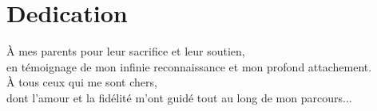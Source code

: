 \documentclass[a4paper, oneside, 12pt, final]{extreport}
\newcommand{\reportAuthor} {%
  Ramzi \textsc{Benfradj}%
}
\begin{document}
%



\chapter*{Dedication}
\thispagestyle{empty}
%

\begin{center}
{\it 
	
À mes parents pour leur sacrifice et leur soutien, \\
en témoignage de mon infinie reconnaissance et mon profond attachement. \\
\vspace{1cm}
À tous ceux qui me sont chers, \\
dont l'amour et la fidélité m'ont guidé tout au long de mon parcours...

}
\end{center}
%
%
\end{document}
